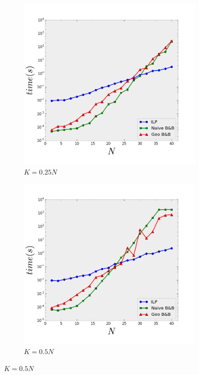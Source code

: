 \begin{figure}[t] 
	\begin{subfigure}[b]{0.3\linewidth}
		\centering
		\includegraphics[width=0.9\linewidth]{Pictures/k1} 
		\caption{$K=0.25N$} 
		\label{fig:fixed_k:a} 
	\end{subfigure}%
	\begin{subfigure}[b]{0.3\linewidth}
		\centering
		\includegraphics[width=0.9\linewidth]{Pictures/k2} 
		\caption{$K=0.5N$} 
		\label{fig:fixed_k:b} 
	\end{subfigure} 

\end{figure}
